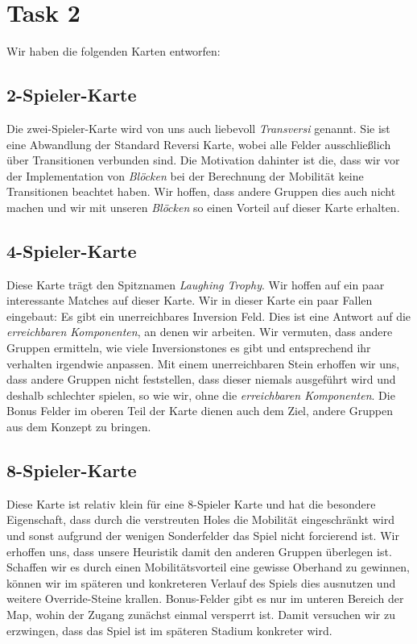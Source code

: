 \section{Task 2}
Wir haben die folgenden Karten entworfen:

\subsection{2-Spieler-Karte}
Die zwei-Spieler-Karte wird von uns auch liebevoll \textit{Transversi} genannt. Sie ist eine Abwandlung der Standard Reversi Karte, wobei alle Felder ausschließlich über Transitionen verbunden sind. Die Motivation dahinter ist die, dass wir vor der Implementation von \textit{Blöcken} bei der Berechnung der Mobilität keine Transitionen beachtet haben. Wir hoffen, dass andere Gruppen dies auch nicht machen und wir mit unseren \textit{Blöcken} so einen Vorteil auf dieser Karte erhalten.

\subsection{4-Spieler-Karte}
Diese Karte trägt den Spitznamen \textit{Laughing Trophy}. Wir hoffen  auf ein paar interessante Matches auf dieser Karte. Wir in dieser Karte ein paar Fallen eingebaut: Es gibt ein unerreichbares Inversion Feld. Dies ist eine Antwort auf die \textit{erreichbaren Komponenten}, an denen wir arbeiten. Wir vermuten, dass andere Gruppen ermitteln, wie viele Inversionstones es gibt und entsprechend ihr verhalten irgendwie anpassen. Mit einem unerreichbaren Stein erhoffen wir uns, dass andere Gruppen nicht feststellen, dass dieser niemals ausgeführt wird und deshalb schlechter spielen, so wie wir, ohne die \textit{erreichbaren Komponenten}. Die Bonus Felder im oberen Teil der Karte dienen auch dem Ziel, andere Gruppen aus dem Konzept zu bringen.

\subsection{8-Spieler-Karte}
Diese Karte ist relativ klein für eine 8-Spieler Karte und hat die besondere Eigenschaft, dass durch die verstreuten Holes die Mobilität eingeschränkt wird und sonst aufgrund der wenigen Sonderfelder das Spiel nicht forcierend ist. Wir erhoffen uns, dass unsere Heuristik damit den anderen Gruppen überlegen ist. Schaffen wir es durch einen Mobilitätsvorteil eine gewisse Oberhand zu gewinnen, können wir im späteren und konkreteren Verlauf des Spiels dies ausnutzen und weitere Override-Steine krallen. Bonus-Felder gibt es nur im unteren Bereich der Map, wohin der Zugang zunächst einmal versperrt ist. Damit versuchen wir zu erzwingen, dass das Spiel ist im späteren Stadium konkreter wird.

